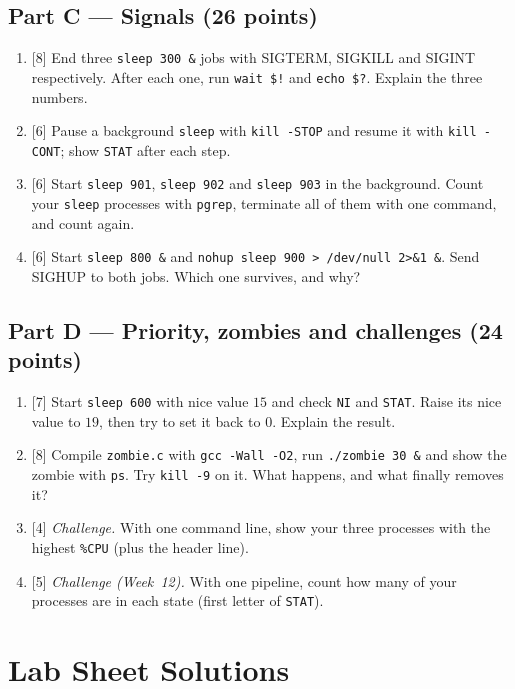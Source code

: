 \documentclass[11pt,a4paper]{article}
\newcommand{\cmd}[1]{\texttt{#1}}
\begin{document}
\subsection*{Part C --- Signals (26 points)}
\begin{enumerate}[leftmargin=2.2em,label=\textbf{C\arabic*}]
  \item {[8]} End three \cmd{sleep 300 \&} jobs with SIGTERM, SIGKILL and SIGINT respectively. After each one, run \cmd{wait \$!} and \cmd{echo \$?}. Explain the three numbers.
  \item {[6]} Pause a background \cmd{sleep} with \cmd{kill -STOP} and resume it with \cmd{kill -CONT}; show \texttt{STAT} after each step.
  \item {[6]} Start \cmd{sleep 901}, \cmd{sleep 902} and \cmd{sleep 903} in the background. Count your \cmd{sleep} processes with \cmd{pgrep}, terminate all of them with one command, and count again.
  \item {[6]} Start \cmd{sleep 800 \&} and \cmd{nohup sleep 900 > /dev/null 2>\&1 \&}. Send SIGHUP to both jobs. Which one survives, and why?
\end{enumerate}

\subsection*{Part D --- Priority, zombies and challenges (24 points)}
\begin{enumerate}[leftmargin=2.2em,label=\textbf{D\arabic*}]
  \item {[7]} Start \cmd{sleep 600} with nice value $15$ and check \texttt{NI} and \texttt{STAT}. Raise its nice value to $19$, then try to set it back to $0$. Explain the result.
  \item {[8]} Compile \texttt{zombie.c} with \cmd{gcc -Wall -O2}, run \cmd{./zombie 30 \&} and show the zombie with \cmd{ps}. Try \cmd{kill -9} on it. What happens, and what finally removes it?
  \item {[4]} \emph{Challenge.} With one command line, show your three processes with the highest \texttt{\%CPU} (plus the header line).
  \item {[5]} \emph{Challenge (Week~12).} With one pipeline, count how many of your processes are in each state (first letter of \texttt{STAT}).
\end{enumerate}

\section{Lab Sheet Solutions}
\label{sec:sol}
\end{document}
